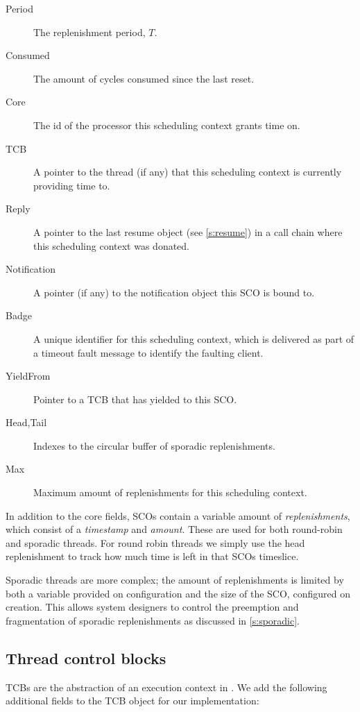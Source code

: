 \begin{description}
    \item[Period] The replenishment period, $T$.
    \item[Consumed] The amount of cycles consumed since the last reset.
    \item[Core] The id of the processor this scheduling context grants time on.
    \item[TCB] A pointer to the thread (if any) that this scheduling context is currently providing time to.
    \item[Reply] A pointer to the last resume object (see \cref{s:resume}) in a call chain where
        this scheduling context was donated.
    \item[Notification] A pointer (if any) to the notification object this \gls{SCO} is bound to.
    \item[Badge] A unique identifier for this scheduling context, which is delivered as part of a
        timeout fault message to identify the faulting client.
    \item[YieldFrom] Pointer to a \gls{TCB} that has yielded to this \gls{SCO}.
    \item[Head,Tail] Indexes to the circular buffer of sporadic replenishments.
    \item[Max] Maximum amount of replenishments for this scheduling context.
\end{description}

In addition to the core fields, \glspl{SCO} contain a variable amount of
\emph{replenishments}, which consist of a \emph{timestamp} and \emph{amount}. These are used for
both round-robin and sporadic threads. For round robin threads we simply use the head replenishment to track how much time is left in that \glspl{SCO} timeslice. 

Sporadic threads are more complex; the amount of replenishments is limited by both a variable provided on configuration and the size of the \gls{SCO}, configured on creation. This allows system designers to control the preemption and fragmentation of sporadic replenishments as discussed in \cref{s:sporadic}.

\subsection{Thread control blocks}

\glspl{TCB} are the abstraction of an execution context in \selfour. We add the following additional fields to the \gls{TCB} object for our implementation:

